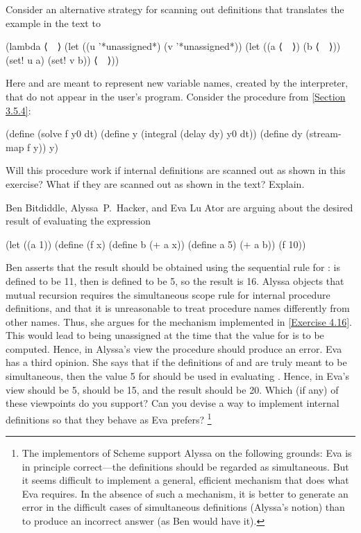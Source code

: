 \begin{exercise}
	\label{Exercise 4.18} Consider an alternative strategy for scanning out definitions that translates the example in the text to
	\begin{scheme}
	  (lambda ⟨~~⟩
	    (let ((u '*unassigned*) (v '*unassigned*))
	      (let ((a ⟨~~⟩) (b ⟨~~⟩))
	        (set! u a)
	        (set! v b))
	      ⟨~~⟩))
	\end{scheme}
	Here  and  are meant to represent new variable names, created by the interpreter, that do not appear in the user’s program.
	Consider the  procedure from \cref{Section 3.5.4}:
	\begin{scheme}
	  (define (solve f y0 dt)
	    (define  y (integral (delay dy) y0 dt))
	    (define dy (stream-map f y))
	    y)
	\end{scheme}
	Will this procedure work if internal definitions are scanned out as shown in this exercise?
	What if they are scanned out as shown in the text?
	Explain.
\end{exercise}



\begin{exercise}
	\label{Exercise 4.19}
	Ben Bitdiddle, Alyssa~P.~Hacker, and Eva Lu Ator are arguing about the desired result of evaluating the expression
	\begin{scheme}
	  (let ((a 1))
	    (define (f x)
	      (define b (+ a x))
	      (define a 5)
	      (+ a b))
	    (f 10))
	\end{scheme}
	Ben asserts that the result should be obtained using the sequential rule for :
	 is defined to be 11, then  is defined to be 5, so the result is 16.
	Alyssa objects that mutual recursion requires the simultaneous scope rule for internal procedure definitions, and that it is unreasonable to treat procedure names differently from other names.
	Thus, she argues for the mechanism implemented in \cref{Exercise 4.16}.
	This would lead to  being unassigned at the time that the value for  is to be computed.
	Hence, in Alyssa’s view the procedure should produce an error.
	Eva has a third opinion.
	She says that if the definitions of  and  are truly meant to be simultaneous, then the value 5 for  should be used in evaluating .
	Hence, in Eva’s view  should be 5,  should be 15, and the result should be 20.
	Which (if any) of these viewpoints do you support?
	Can you devise a way to implement internal definitions so that they behave as Eva prefers?%
	\footnote{
		The  implementors of Scheme support Alyssa on the following grounds:
		Eva is in principle correct---the definitions should be regarded as simultaneous.
		But it seems difficult to implement a general, efficient mechanism that does what Eva requires.
		In the absence of such a mechanism, it is better to generate an error in the difficult cases of simultaneous definitions (Alyssa’s notion) than to produce an incorrect answer (as Ben would have it).
	}
\end{exercise}



